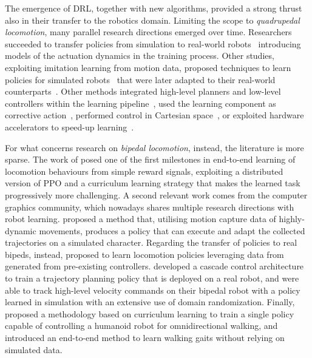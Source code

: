 \pagebreak[1]
The emergence of \ac{DRL}, together with new algorithms, provided a strong thrust also in their transfer to the robotics domain.
Limiting the scope to \emph{quadrupedal locomotion}, many parallel research directions emerged over time.
Researchers succeeded to transfer policies from simulation to real-world robots~\parencite{tan_sim--real_2018, hwangboLearningAgileDynamic2019s} introducing
models of the actuation dynamics in the training process.
Other studies, exploiting imitation learning from motion data, proposed techniques to learn policies for simulated robots~\parencite{peng_learning_2020} that were later adapted to their real-world counterparts~\parencite{smith_legged_2021}.
Other methods integrated high-level planners and low-level controllers within the learning pipeline~\parencite{tsounis_deepgait_2020}, used the learning component as corrective action~\parencite{gangapurwala_real-time_2021}, performed control in Cartesian space~\parencite{bellegarda_robust_2021}, or exploited hardware accelerators to speed-up learning~\parencite{rudin_learning_2021}.

For what concerns research on \emph{bipedal locomotion}, instead, the literature is more sparse.
The work of \textcite{heess_emergence_2017} posed one of the first milestones in end-to-end learning of locomotion behaviours from simple reward signals, exploiting a distributed version of \ac{PPO} and a curriculum learning strategy that makes the learned task progressively more challenging.
A second relevant work comes from the computer graphics community, which nowadays shares multiple research directions with robot learning.
\textcite{peng_deepmimic_2018} proposed a method that, utilising motion capture data of highly-dynamic movements, produces a policy that can execute and adapt the collected trajectories on a simulated character.
Regarding the transfer of policies to real bipeds, instead, \textcite{xieIterativeReinforcementLearning2019s} proposed to learn locomotion policies leveraging data from generated from pre-existing controllers.
\textcite{castillo_robust_2021} developed a cascade control architecture to train a trajectory planning policy that is deployed on a real robot, and \textcite{li_reinforcement_2021} were able to track high-level velocity commands on their bipedal robot with a policy learned in simulation with an extensive use of domain randomization.
Finally, \textcite{rodriguez_deepwalk_2021} proposed a methodology based on curriculum learning to train a single policy capable of controlling a humanoid robot for omnidirectional walking, and \textcite{bloesch_towards_2022} introduced an end-to-end method to learn walking gaits without relying on simulated data.

